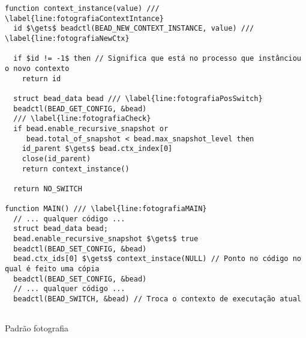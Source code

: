 \begin{pseudocode}
\begin{lstlisting}[language=pseudocode, style=pseudocode]
function context_instance(value) /// \label{line:fotografiaContextIntance}
  id $\gets$ beadctl(BEAD_NEW_CONTEXT_INSTANCE, value) /// \label{line:fotografiaNewCtx}

  if $id != -1$ then // Significa que está no processo que instânciou o novo contexto
    return id

  struct bead_data bead /// \label{line:fotografiaPosSwitch}
  beadctl(BEAD_GET_CONFIG, &bead)
  /// \label{line:fotografiaCheck}
  if bead.enable_recursive_snapshot or
     bead.total_of_snapshot < bead.max_snapshot_level then
    id_parent $\gets$ bead.ctx_index[0]
    close(id_parent)
    return context_instance()

  return NO_SWITCH

function MAIN() /// \label{line:fotografiaMAIN}
  // ... qualquer código ...
  struct bead_data bead;
  bead.enable_recursive_snapshot $\gets$ true
  beadctl(BEAD_SET_CONFIG, &bead)
  bead.ctx_ids[0] $\gets$ context_instace(NULL) // Ponto no código no qual é feito uma cópia
  beadctl(BEAD_SET_CONFIG, &bead)
  // ... qualquer código ...
  beadctl(BEAD_SWITCH, &bead) // Troca o contexto de executação atual
  
\end{lstlisting}

  \caption{Padrão fotografia}
  \label{alg:fotografia}
\end{pseudocode}
